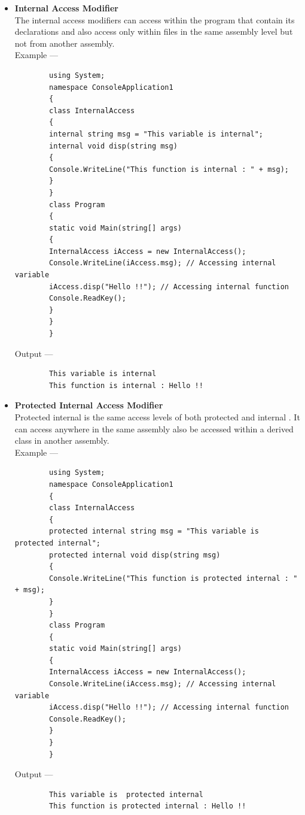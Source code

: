 \documentclass[11pt,dvipsnames,cmyk]{article}
\begin{document}
\begin{itemize}
	 	\item \textbf{Internal Access Modifier}
	 	\\The internal access modifiers can access within the program that contain its declarations and also access only within files in the same assembly level but not from another assembly.
	 	\\Example ---
	 	\begin{verbatim}
	 	using System;
	 	namespace ConsoleApplication1
	 	{
	 	class InternalAccess
	 	{
	 	internal string msg = "This variable is internal";
	 	internal void disp(string msg)
	 	{
	 	Console.WriteLine("This function is internal : " + msg);
	 	}
	 	}
	 	class Program
	 	{
	 	static void Main(string[] args)
	 	{
	 	InternalAccess iAccess = new InternalAccess();
	 	Console.WriteLine(iAccess.msg); // Accessing internal variable
	 	iAccess.disp("Hello !!"); // Accessing internal function
	 	Console.ReadKey();
	 	}
	 	}
	 	}
	 	\end{verbatim}
	 	Output ---
	 	\begin{verbatim}
	 	This variable is internal
	 	This function is internal : Hello !!
	 	\end{verbatim}
	 	
	 	\item \textbf{Protected Internal Access Modifier}
	 	\\Protected internal is the same access levels of both protected and internal . It can access anywhere in the same assembly also be accessed within a derived class in another assembly.
	 	\\Example ---
	 	\begin{verbatim}
	 	using System;
	 	namespace ConsoleApplication1
	 	{
	 	class InternalAccess
	 	{
	 	protected internal string msg = "This variable is  protected internal";
	 	protected internal void disp(string msg)
	 	{
	 	Console.WriteLine("This function is protected internal : " + msg);
	 	}
	 	}
	 	class Program
	 	{
	 	static void Main(string[] args)
	 	{
	 	InternalAccess iAccess = new InternalAccess();
	 	Console.WriteLine(iAccess.msg); // Accessing internal variable
	 	iAccess.disp("Hello !!"); // Accessing internal function
	 	Console.ReadKey();
	 	}
	 	}
	 	}
	 	\end{verbatim}
	 	Output ---
	 	\begin{verbatim}
	 	This variable is  protected internal
	 	This function is protected internal : Hello !!
	 	\end{verbatim}
	 	

\end{itemize}
\end{document}
